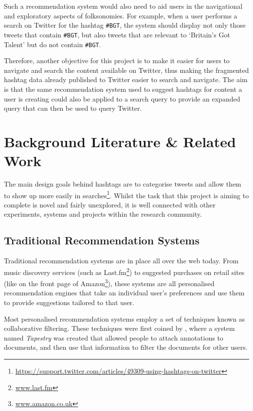 \documentclass[11pt,a4paper]{report}
\begin{document}
Such a recommendation system would also need to aid users in the navigational and exploratory aspects of folksonomies. For example, when a user performs a search on Twitter for the hashtag \texttt{\#BGT}, the system should display not only those tweets that contain \texttt{\#BGT}, but also tweets that are relevant to `Britain's Got Talent' but do not contain \texttt{\#BGT}.

Therefore, another objective for this project is to make it easier for users to navigate and search the content available on Twitter, thus making the fragmented hashtag data already published to Twitter easier to search and navigate. The aim is that the same recommendation system used to suggest hashtags for content a user is creating could also be applied to a search query to provide an expanded query that can then be used to query Twitter.

\pagebreak

\chapter{Background Literature \& Related Work}
\label{chap:litreview}
The main design goals behind hashtags are to categorise tweets and allow them to show up more easily in searches\footnote{\url{https://support.twitter.com/articles/49309-using-hashtags-on-twitter}}. Whilst the task that this project is aiming to complete is novel and fairly unexplored, it is well connected with other experiments, systems and projects within the research community.

\section{Traditional Recommendation Systems}
Traditional recommendation systems are in place all over the web today. From music discovery services (such as Last.fm\footnote{\url{www.last.fm}}) to suggested purchases on retail sites (like on the front page of Amazon\footnote{\url{www.amazon.co.uk}}), these systems are all personalised recommendation engines that take an individual user's preferences and use them to provide suggestions tailored to that user.

Most personalised recommendation systems employ a set of techniques known as collaborative filtering. These techniques were first coined by \textcite{Goldberg:1992}, where a system named \emph{Tapestry} was created that allowed people to attach annotations to documents, and then use that information to filter the documents for other users.
\end{document}

